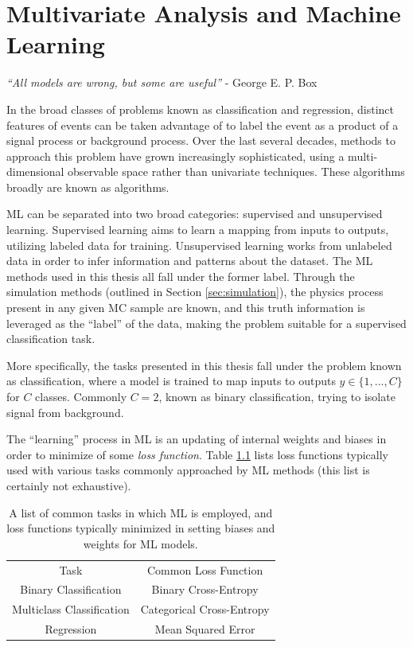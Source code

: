 
\chapter{Multivariate Analysis and Machine Learning}
{\textit{``All models are wrong, but some are useful''} - George E. P. Box} \label{app:MVA}

In the broad classes of problems known as classification and regression, distinct features of events can be taken advantage of to label the event as a product of a signal process or background process. Over the last several decades, methods to approach this problem have grown increasingly sophisticated, using a multi-dimensional observable space rather than univariate techniques. These algorithms broadly are known as  algorithms.


\gls{ML} can be separated into two broad categories: supervised and unsupervised learning. Supervised learning aims to learn a mapping from inputs to outputs, utilizing labeled data for training. Unsupervised learning works from unlabeled data in order to infer information and patterns about the dataset. The \gls{ML} methods used in this thesis all fall under the former label. Through the simulation methods (outlined in Section \ref{sec:simulation}), the physics process present in any given \gls{MC} sample are known, and this truth information is leveraged as the ``label'' of the data, making the problem suitable for a supervised classification task.

More specifically, the tasks presented in this thesis fall under the problem known as classification, where a model is trained to map inputs to outputs $y \in \{1,...,C\}$ for $C$ classes. Commonly $C=2$, known as binary classification, trying to isolate signal from background.  

The ``learning'' process in \gls{ML} is an updating of internal weights and biases in order to minimize of some \textit{loss function}. Table \ref{tab:loss-functions} lists loss functions typically used with various tasks commonly approached by \gls{ML} methods (this list is certainly not exhaustive).

\begin{table}[!ht]
    \centering
    \begin{tabular}{c|c}
        Task                  & Common Loss Function \\
        \cline{1-2}
        Binary Classification     & Binary Cross-Entropy\\
        Multiclass Classification & Categorical Cross-Entropy\\
        Regression                & Mean Squared Error
    \end{tabular}  
    \caption[A list of common tasks in which \gls{ML} is employed, and loss functions typically used.]{A list of common tasks in which \gls{ML} is employed, and loss functions typically minimized in setting biases and weights for \gls{ML} models.}
    \label{tab:loss-functions}
\end{table}


